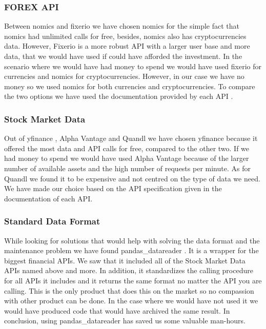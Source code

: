 \documentclass[main.tex]{subfiles}
\begin{document}
\subsubsection*{FOREX API}
Between nomics \cite{nomics-python} and fixerio \cite{fixerio} we have chosen nomics for the simple fact that nomics had unlimited calls for free, besides, nomics also has cryptocurrencies data. However, Fixerio is a more robust API with a larger user base and more data, that we would have used if could have afforded the investment. In the scenario where we would have had money to spend we would have used fixerio for currencies and nomics for cryptocurrencies. However, in our case we have no money so we used nomics for both currencies and cryptocurrencies. To compare the two options we have used the documentation provided by each API . \newline

\subsubsection*{Stock Market Data}
Out of yfinance \cite{yfinance}, Alpha Vantage \cite{alphavantage}and Quandl \cite{quandl} we have chosen yfinance because it offered the most data and API calls for free, compared to the other two. If we had money to spend we would have used Alpha Vantage because of the larger number of available assets and the high number of requests per minute. As for Quandl we found it to be expensive and not centred on the type of data we need. We have made our choice based on the API specification given in the documentation of each API.\newline

\subsubsection*{Standard Data Format}
While looking for solutions that would help with solving the data format and the maintenance problem we have found pandas\_datareader \cite{pandas_datareader}. It is a wrapper for the biggest financial APIs. We saw that it included all of the Stock Market Data APIs named above and more. 
In addition, it standardizes the calling procedure for all APIs it includes and it returns the same format no matter the API you are calling. This is the only product that does this on the market so no compassion with other product can be done. In the case where we would have not used it we would have produced code that would have archived the same result. In conclusion, using pandas\_datareader has saved us some valuable man-hours.\newline
    
\end{document}
